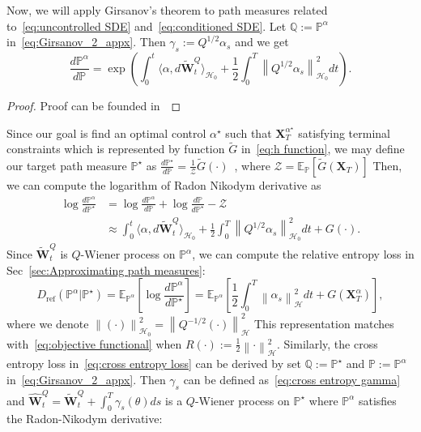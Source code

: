 \documentclass[nohyperref]{article}
\theoremstyle{plain}
\theoremstyle{remark}
\newcommand{\la}{\langle}
\newcommand{\ra}{\rangle}
\newcommand{\mc}{\mathcal}
\newcommand{\mb}{\mathbf}
\newcommand{\norm}[1]{\left\lVert#1\right\rVert}
\begin{document}
Now, we will apply Girsanov's theorem to path measures related to~\eqref{eq:uncontrolled SDE} and~\eqref{eq:conditioned SDE}. Let $\mathbb{Q} := \mathbb{P}^{\alpha}$ in~\eqref{eq:Girsanov_2_appx}. Then $\gamma_s := Q^{1/2}\alpha_s$ and we get
\begin{equation}
    \frac{d\mathbb{P}^{\alpha}}{d\mathbb{P}} = \exp\left( \int_0^t \la \alpha, d\mb{\tilde{W}}^Q_t\ra_{\mc{H}_0} + \frac{1}{2} \int_0^T  \norm{Q^{1/2}\alpha_s}_{\mc{H}_0}^2 dt\right).
\end{equation}
\begin{proof}
    Proof can be founded in~\citep[Theorem~10.14]{da2014stochastic}
\end{proof}
Since our goal is find an optimal control $\alpha^{\star}$ such that $\mb{X}_T^{\alpha^{\star}}$ satisfying terminal constraints which is represented by function $\tilde{G}$ in~\eqref{eq:h function}, we may define our target path measure $\mathbb{P}^{\star}$ as $\frac{d\mathbb{P}^{\star}}{d\mathbb{P}}  = \frac{1}{\mc{Z}}\tilde{G}(\cdot) $~\citep{richter2024improved}, where $\mc{Z} = \mathbb{E}_{\mathbb{P}}\left[\tilde{G}(\mb{X}_T)\right]$ Then, we can compute the logarithm of Radon Nikodym derivative as
\begin{align}
    \log \frac{d\mathbb{P}^{\alpha}}{d\mathbb{P}^{\star}} &= \log \frac{d\mathbb{P}^{\alpha}}{d\mathbb{P}} + \log \frac{d\mathbb{P}}{d\mathbb{P}^{\star}} - \mc{Z} \\
    & \approx \int_0^t \la \alpha, d\mb{\tilde{W}}^Q_t\ra_{\mc{H}_0} + \frac{1}{2} \int_0^T  \norm{Q^{1/2}\alpha_s}_{\mc{H}_0}^2 dt + G(\cdot).
\end{align}
Since $\mb{\tilde{W}}^Q_t$ is $Q$-Wiener process on $\mathbb{P}^{\alpha}$, we can compute the relative entropy loss in Sec~\ref{sec:Approximating path measures}:
\begin{equation}\label{eq:relative entropy loss_appx}
    D_{\text{ref}}(\mathbb{P}^{\alpha}|\mathbb{P}^{\star}) = \mathbb{E}_{\mathbb{P}^{\alpha}}\left[\log \frac{d\mathbb{P}^{\alpha}}{d\mathbb{P}^{\star}}\right] = \mathbb{E}_{\mathbb{P}^{\alpha}}\left[\frac{1}{2} \int_0^T  \norm{\alpha_s}_{\mc{H}}^2 dt + G(\mb{X}_T^{\alpha}) \right],
\end{equation}
where we denote $\norm{(\cdot)}_{\mc{H}_0}^2 = \norm{Q^{-1/2}(\cdot)}_{\mc{H}}^2 $
This representation matches with~\eqref{eq:objective functional} when $R(\cdot):=\frac{1}{2}\norm{\cdot}_{\mc{H}}^2$. Similarly, the cross entropy loss in~\eqref{eq:cross entropy loss} can be derived by set $\mathbb{Q}:=\mathbb{P}^{\star}$ and $\mathbb{P} := \mathbb{P}^{\alpha}$ in~\eqref{eq:Girsanov_2_appx}. Then $\gamma_s$ can be defined as~\eqref{eq:cross entropy gamma} and $\mb{\hat{W}}^Q_t = \mb{\tilde{W}}^Q_t + \int_0^T \gamma_s(\theta) ds$ is a $Q$-Wiener process on $\mathbb{P}^{\star}$ where $\mathbb{P}^{\alpha}$ satisfies the Radon-Nikodym derivative:
\end{document}
